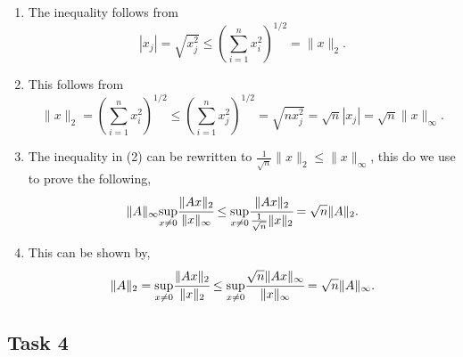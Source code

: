 \documentclass[a4paper,12pt]{article}
\begin{document}
\begin{enumerate}
  \item
    The inequality follows from
    \[
      |x_j|
        = \sqrt{x_j^2}
        \le \left(\sum_{i=1}^n x_i^2\right)^{1/2}
        = \|x\|_2.
    \]

  \item
    This follows from
    \[
      \|x\|_2
        = \left(\sum_{i=1}^n x_i^2\right)^{1/2}
        \le \left(\sum_{i=1}^n x_j^2\right)^{1/2}
        = \sqrt{nx_j^2}
        = \sqrt{n}|x_j|
        = \sqrt{n}\|x\|_\infty.
    \]

  \item
  The inequality in (2) can be rewritten to $ \frac{1}{\sqrt{n}} \|x\|_2 \le \|x\|_\infty$, this do we use to prove the following,
  \begin{equation}
  \|A\|_\infty \underset{x\not=0}{\sup} \cfrac{\|Ax\|_2}{\|x\|_\infty }\le \underset{x\not=0}{\sup} \cfrac{\|Ax\|_2}{\frac{1}{\sqrt{n}}\|x\|_2}=\sqrt{n}\|A\|_2.
  \end{equation}
  
  
  \iffalse
    The maximum preserves inequalities, so by 1 we have:
    \[
      \|A\|_\infty
        = \max_{\|x\| = 1} \|Ax\|_\infty
        \le \max_{\|x\| = 1} \|Ax\|_2
        = \|A\|_2,
    \]
    and obviously \(\|A\|_2 \le \sqrt{n}\|A\|_2\).
  \fi
  \item
  
  This can be shown by,
  \begin{equation}
  \|A\|_2=\underset{x\not=0}{\sup} \cfrac{\|Ax\|_2}{\|x\|_2}\le \underset{x\not=0}{\sup} \cfrac{\sqrt{n}\|Ax\|_\infty}{\|x\|_\infty} =\sqrt{n}\|A\|_\infty.
  \end{equation}
  \iffalse
    Again by the fact that the maximum preserves inequalities, 2 gives
    \begin{align*}
      \|A\|_2
      &= \max_{\|x\| = 1} \|Ax\|_2 \\
      &\le \max_{\|x\| = 1} \sqrt{n}\|Ax\|_\infty \\
      &= \sqrt{n} \max_{\|x\| = 1} \|Ax\|_\infty \\
      &= \sqrt{n} \|Ax\|_\infty.
    \end{align*}
  \fi
\end{enumerate}


\subsection*{Task 4}
\end{document}
